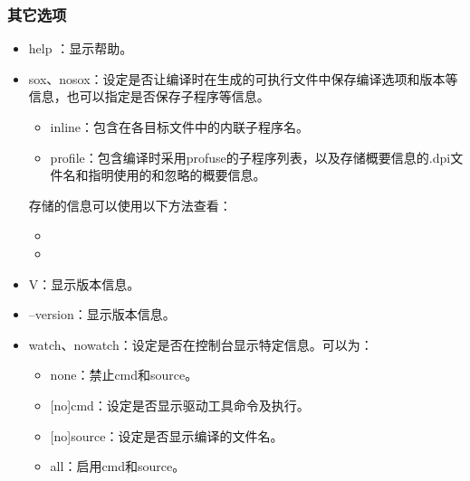 \documentclass[a4paper,12pt,english]{sphinxmanual}
\begin{document}
\subsubsection{其它选项}
\label{\detokenize{compiler/intel:id15}}\begin{itemize}
\item {} 
\sphinxAtStartPar
\sphinxhyphen{}help \sphinxstyleemphasis{{[}category{]}}：显示帮助。

\item {} 
\sphinxAtStartPar
\sphinxhyphen{}sox\sphinxstyleemphasis{{[}=keyword{[},keyword{]}{]}}、\sphinxhyphen{}no\sphinxhyphen{}sox：设定是否让编译时在生成的可执行文件中保存编译选项和版本等信息，也可以指定是否保存子程序等信息。
\begin{itemize}
\item {} 
\sphinxAtStartPar
inline：包含在各目标文件中的内联子程序名。

\item {} 
\sphinxAtStartPar
profile：包含编译时采用\sphinxhyphen{}prof\sphinxhyphen{}use的子程序列表，以及存储概要信息的.dpi文件名和指明使用的和忽略的概要信息。

\end{itemize}

\sphinxAtStartPar
存储的信息可以使用以下方法查看：
\begin{itemize}
\item {} 
\sphinxAtStartPar
{}

\item {} 
\sphinxAtStartPar
{}

\end{itemize}

\item {} 
\sphinxAtStartPar
\sphinxhyphen{}V：显示版本信息。

\item {} 
\sphinxAtStartPar
–version：显示版本信息。

\item {} 
\sphinxAtStartPar
\sphinxhyphen{}watch\sphinxstyleemphasis{{[}=keyword{[}, keyword…{]}{]}}、\sphinxhyphen{}nowatch：设定是否在控制台显示特定信息。可以为：
\begin{itemize}
\item {} 
\sphinxAtStartPar
none：禁止cmd和source。

\item {} 
\sphinxAtStartPar
{[}no{]}cmd：设定是否显示驱动工具命令及执行。

\item {} 
\sphinxAtStartPar
{[}no{]}source：设定是否显示编译的文件名。

\item {} 
\sphinxAtStartPar
all：启用cmd和source。

\end{itemize}

\end{itemize}
\end{document}
